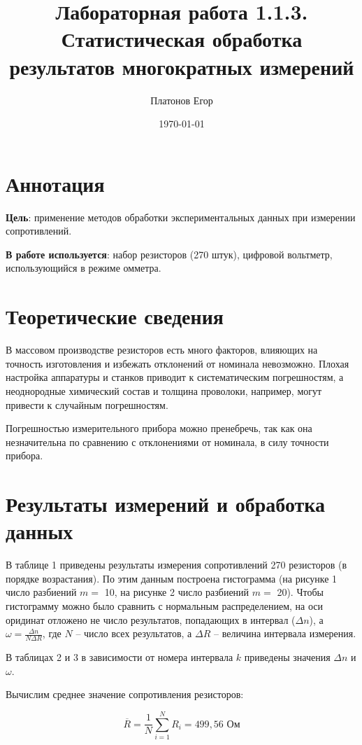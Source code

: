 \documentclass[a4paper, 12pt]{article}
\title{Лабораторная работа 1.1.3. Статистическая обработка результатов многократных измерений}
\author{Платонов Егор}
\date{\today}
\begin{document}
	
\maketitle


\section{Аннотация}
\textbf{Цель}: применение методов обработки экспериментальных данных при измерении сопротивлений.

\textbf{В работе используется}: набор резисторов (270 штук), цифровой вольтметр, использующийся в режиме омметра.

\section{Теоретические сведения}
В массовом производстве резисторов есть много факторов, влияющих на точность изготовления и избежать отклонений от номинала невозможно. Плохая настройка аппаратуры и станков приводит к систематическим погрешностям, а неоднородные химический состав и толщина проволоки, например, могут привести к случайным погрешностям.

Погрешностью измерительного прибора можно пренебречь, так как она незначительна по сравнению с отклонениями от номинала, в силу точности прибора.


\section{Результаты измерений и обработка данных}

В таблице 1 приведены результаты измерения сопротивлений 270 резисторов (в порядке возрастания). По этим данным построена гистограмма (на рисунке 1 число разбиений $m=$ 10, на рисунке 2 число разбиений $m=$ 20). Чтобы гистограмму можно было сравнить с нормальным распределением, на оси оридинат отложено не число результатов, попадающих в интервал ($\Delta n$), а $\omega = \frac{\Delta n}{N\Delta R}$, где $N$ -- число всех результатов, а $\Delta R$ -- величина интервала измерения.

В таблицах 2 и 3 в зависимости от номера интервала $k$ приведены значения $\Delta n$ и $\omega$.

Вычислим среднее значение сопротивления резисторов:

\begin{equation}
    \overline{R}=\frac{1}{N}\sum_{i=1}^N R_i = 499,56 \text{ Ом}
\end{equation}
\end{document}
